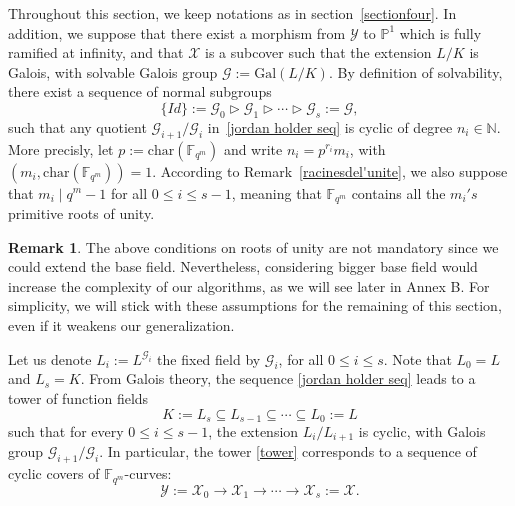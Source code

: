 \documentclass[10pt]{article}
\theoremstyle{definition}
\newtheorem{rq1}[thm]{Remark}
\theoremstyle{definition}
\theoremstyle{definition}
\newcommand{\N}{\mathbb{N}}
\newcommand{\Fqm}{\mathbb{F}_{q^m}}
\newcommand{\su}{\subseteq}
\newcommand{\X}{\mathcal{X}}
\newcommand{\Y}{\mathcal{Y}}
\newcommand{\G}{\mathcal{G}}
\begin{document}
Throughout this section, we keep notations as in section~\ref{sectionfour}.
In addition, we suppose that there exist a morphism from $\Y$ to $\mathbb{P}^1$ which is fully ramified at infinity, and that $\X$ is a subcover such that the extension $L/K$ is Galois, with solvable Galois group $\G := \mathrm{Gal}(L/K)$. By definition of solvability, there exist a sequence of normal subgroups 
\begin{equation} \label{jordan holder seq}
 \{Id\} := \G_0 \triangleright \G_1 \triangleright \cdots \triangleright \G_s := \G, 
\end{equation} 
such that any quotient $\G_{i+1}/\G_i$ in~\eqref{jordan holder seq} is cyclic of degree $n_i \in \N$. 
More precisly, let $p := \mathrm{char}(\Fqm)$ and write $n_i = p^{r_i}m_i$, with $(m_i,\mathrm{char}(\Fqm))=1$. According to Remark~\ref{racinesdel'unite}, we also suppose that $m_i \mid q^m-1$ for all $0\leq i\leq s-1$, meaning that $\Fqm$ contains all the $m_i's$ primitive roots of unity. 

\begin{rq1} \label{base_filed_extension}
The above conditions on roots of unity are not mandatory since we could extend the base field. Nevertheless, considering bigger base field would increase the complexity of our algorithms, as we will see later in Annex B. For simplicity, we will stick with these assumptions for the remaining of this section, even if it weakens our generalization.  
\end{rq1}

Let us denote $L_i := L^{\G_i}$ the fixed field by $\G_i$, for all $0 \leq i \leq s$. Note that $L_0=L$ and $L_s=K$. From Galois theory, the sequence \eqref{jordan holder seq} leads to a tower of function fields
\begin{equation} \label{tower}
K := L_s \su L_{s-1} \su \cdots \su L_0 := L
\end{equation}
such that for every $0\leq i\leq s-1$, the extension $L_i/L_{i+1}$ is cyclic, with Galois group $\G_{i+1}/\G_i$. In particular, the tower \eqref{tower} corresponds to a sequence of cyclic covers of $\Fqm$-curves:
\begin{equation} \label{curve tower}
\Y := \X_0 \longrightarrow \X_1 \longrightarrow \cdots \longrightarrow \X_s := \X.
\end{equation}
\end{document}
